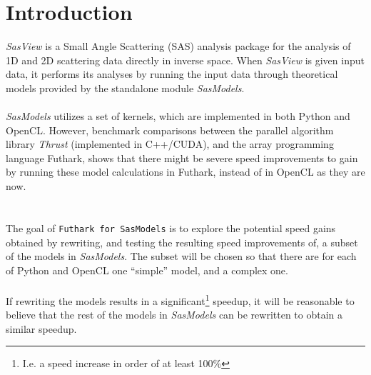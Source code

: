 \documentclass[11pt]{article}
\newcommand{\sasmodels}{\textit{SasModels}}
\newcommand{\sasview}{\textit{SasView}}
\newcommand{\futhark}{\texttt{Futhark for SasModels}}
\begin{document}
\section{Introduction}
\sasview{} is a Small Angle Scattering (SAS) analysis package for the
analysis of 1D and 2D scattering data directly in inverse space.
When \sasview{} is given input data, it performs its analyses by running the
input data through theoretical models provided by the standalone module
\sasmodels{}.
\\\\
\sasmodels{} utilizes a set of kernels, which are implemented
in both Python and OpenCL. However, benchmark
comparisons\cite[sec. 5.3]{array16}
between the parallel algorithm library \textit{Thrust}
(implemented in C++/CUDA), and the array programming language Futhark, shows
that there might be severe speed improvements to gain by running these model
calculations in Futhark, instead of in OpenCL as they are now.\\
\\\\
The goal of \futhark{} is to explore the potential speed gains obtained by
rewriting, and testing the resulting speed improvements of, a subset of the
models in \sasmodels{}.
The subset will be chosen so that there are for each of Python and OpenCL 
one ``simple'' model, and a complex one.
\\\\
If rewriting the models results in a significant\footnote{I.e. a speed increase
  in order of at least 100\%} speedup, it will be reasonable to believe that 
  the rest of the models in \sasmodels{} can be rewritten to obtain a similar
  speedup.
\end{document}
